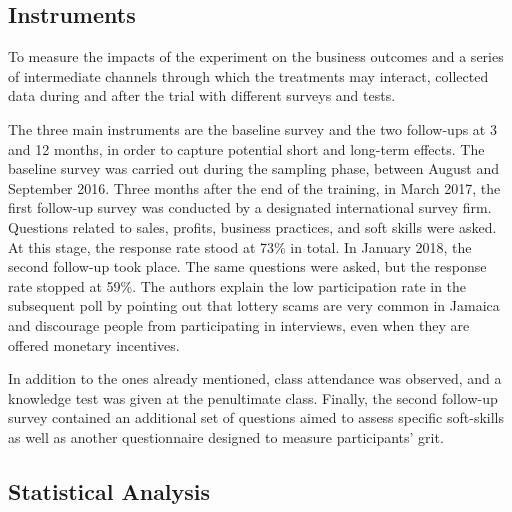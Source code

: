 \subsection{Instruments}

To measure the impacts of the experiment on the business outcomes and a series of intermediate channels through which the treatments may interact, \cite{Ubfal2022} collected data during and after the trial with different surveys and tests.

The three main instruments are the baseline survey and the two follow-ups at 3 and 12 months, in order to capture potential short and long-term effects. The baseline survey was carried out during the sampling phase, between August and September 2016. Three months after the end of the training, in March 2017, the first follow-up survey was conducted  by a designated international survey firm. Questions related to sales, profits, business practices, and soft skills were asked. At this stage, the response rate stood at 73\% in total. In January 2018, the second follow-up took place. The same questions were asked, but the response rate stopped at 59\%. The authors explain the low participation rate in the subsequent poll by pointing out that lottery scams are very common in Jamaica and discourage people from participating in interviews, even when they are offered monetary incentives.

In addition to the ones already mentioned, class attendance was observed, and a knowledge test was given at the penultimate class. Finally, the second follow-up survey contained an additional set of questions aimed to assess specific soft-skills as well as another questionnaire designed to measure participants' grit.

\subsection{Statistical Analysis}

